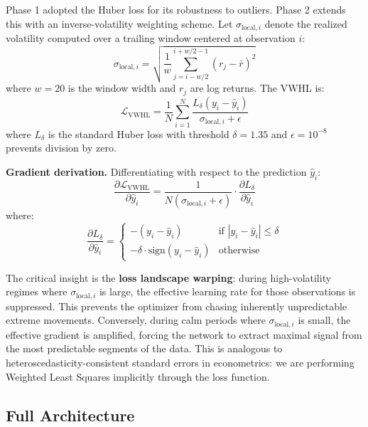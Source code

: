 \documentclass[conference]{IEEEtran}
\begin{document}
Phase 1 adopted the Huber loss for its robustness to outliers. Phase 2 extends this with an inverse-volatility weighting scheme. Let $\sigma_{\text{local}, i}$ denote the realized volatility computed over a trailing window centered at observation $i$:
\begin{equation}
\sigma_{\text{local}, i} = \sqrt{\frac{1}{w}\sum_{j=i-w/2}^{i+w/2-1}(r_j - \bar{r})^2}
\end{equation}
where $w = 20$ is the window width and $r_j$ are log returns. The VWHL is:
\begin{equation}
\mathcal{L}_{\text{VWHL}} = \frac{1}{N}\sum_{i=1}^{N} \frac{L_\delta(y_i - \hat{y}_i)}{\sigma_{\text{local},i} + \epsilon}
\label{eq:vwhl}
\end{equation}
where $L_\delta$ is the standard Huber loss with threshold $\delta = 1.35$ and $\epsilon = 10^{-8}$ prevents division by zero.

\textbf{Gradient derivation.} Differentiating with respect to the prediction $\hat{y}_i$:
\begin{equation}
\frac{\partial \mathcal{L}_{\text{VWHL}}}{\partial \hat{y}_i} = \frac{1}{N(\sigma_{\text{local},i} + \epsilon)} \cdot \frac{\partial L_\delta}{\partial \hat{y}_i}
\end{equation}
where:
\begin{equation}
\frac{\partial L_\delta}{\partial \hat{y}_i} = \begin{cases}
-(y_i - \hat{y}_i) & \text{if } |y_i - \hat{y}_i| \le \delta \\
-\delta \cdot \text{sign}(y_i - \hat{y}_i) & \text{otherwise}
\end{cases}
\end{equation}

The critical insight is the \textbf{loss landscape warping}: during high-volatility regimes where $\sigma_{\text{local},i}$ is large, the effective learning rate for those observations is suppressed. This prevents the optimizer from chasing inherently unpredictable extreme movements. Conversely, during calm periods where $\sigma_{\text{local},i}$ is small, the effective gradient is amplified, forcing the network to extract maximal signal from the most predictable segments of the data. This is analogous to heteroscedasticity-consistent standard errors in econometrics: we are performing Weighted Least Squares implicitly through the loss function.

\subsection{Full Architecture}
\label{sec:full_arch}
\end{document}
